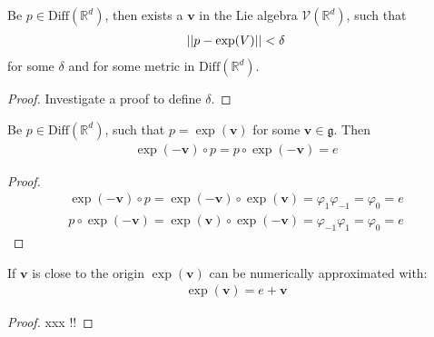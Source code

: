 \begin{lemma}[existence]\label{le:existencelemma}
	Be $p \in \text{Diff}(\mathbb{R}^{d})$, then exists a $\mathbf{v}$ in the Lie algebra $\mathcal{V}(\mathbb{R}^{d})$, such that 
	\begin{align*}
	\vert\lvert p - \exp(V) \rvert\vert < \delta
	\end{align*}
	for some $\delta$ and for some metric in $\text{Diff}(\mathbb{R}^{d})$.
\end{lemma}
\begin{proof}
	Investigate a proof to define $\delta$.
\end{proof}
%
\begin{lemma}\label{le:idlemma}
	Be $p\in \text{Diff}(\mathbb{R}^{d})$, such that $p= \exp(\mathbf{v} )$ for some $\mathbf{v} \in\mathfrak{g}$. Then
	\begin{align*}
	\exp(-\mathbf{v} )\circ p = p \circ \exp(-\mathbf{v} ) = e
	\end{align*}
\end{lemma}
\begin{proof}
	\begin{align*}
	\exp(-\mathbf{v})\circ p = \exp(-\mathbf{v})\circ \exp(\mathbf{v}) =  \varphi_{1}\varphi_{-1} = \varphi_{0} = e \\
	p \circ \exp(-\mathbf{v}) = \exp(\mathbf{v})\circ \exp(-\mathbf{v}) =  \varphi_{-1}\varphi_{1} = \varphi_{0} = e
	\end{align*}
\end{proof}
%

\begin{prop}\label{le:taylorlemma}
	If $\mathbf{v} $ is close to the origin $\exp(\mathbf{v} )$ can be numerically approximated with:
	\begin{align*}
	\exp(\mathbf{v} ) = e + \mathbf{v} 
	\end{align*}
\end{prop}
\begin{proof}
	xxx !!
\end{proof}



